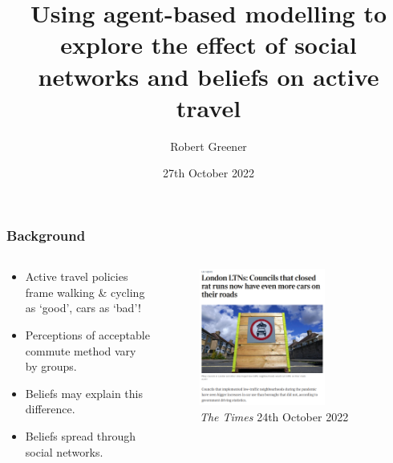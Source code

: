\documentclass[aspectratio=169]{beamer}
\title{Using agent-based modelling to explore the effect of social networks and beliefs on active travel}
\author{Robert Greener}
\institute{London School of Hygiene and Tropical Medicine}
\date{27th October 2022}
\begin{document}
\maketitle

\begin{frame}
    \frametitle{Background}
    \begin{columns}
        \begin{column}{0.5\textwidth}
            \begin{itemize}
                \item Active travel policies frame walking \& cycling as `good', cars as `bad'!
                \item Perceptions of acceptable commute method vary by groups.
                \item Beliefs may explain this difference.
                \item Beliefs spread through social networks.
            \end{itemize}
        \end{column}
        \begin{column}{0.5\textwidth}
            \begin{figure}[H]
                \includegraphics[width=0.7\textwidth]{figures/the-times.png}
                \caption{\emph{The Times} 24th October 2022}
            \end{figure}
        \end{column}
    \end{columns}
\end{frame}
\end{document}
